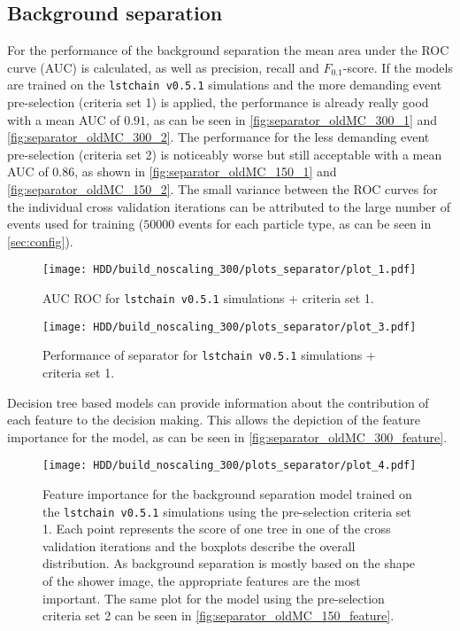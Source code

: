 \subsection{Background separation}
For the performance of the background separation the mean area under the ROC curve (AUC) is calculated, as well as precision, recall and $F_{0.1}$-score.
If the models are trained on the \texttt{lstchain v0.5.1} simulations and the more demanding event pre-selection (criteria set 1) is applied,
the performance is already really good with a mean AUC of $\num{0.91}$, as can be seen in \autoref{fig:separator_oldMC_300_1} and \autoref{fig:separator_oldMC_300_2}.
The performance for the less demanding event pre-selection (criteria set 2) is noticeably worse but still acceptable with a mean AUC of $\num{0.86}$, as shown in
\autoref{fig:separator_oldMC_150_1} and \autoref{fig:separator_oldMC_150_2}. The small variance between the ROC curves for the individual cross validation iterations 
can be attributed to the large number of events used for training ($\num{50000}$ events for each particle type, as can be seen in \autoref{sec:config}). 
\begin{figure}
    \centering
    \texttt{[image: HDD/build\_noscaling\_300/plots\_separator/plot\_1.pdf]}
    \caption{AUC ROC for \texttt{lstchain v0.5.1} simulations + criteria set 1.}
    \label{fig:separator_oldMC_300_1}
\end{figure}
\begin{figure}
    \centering
    \texttt{[image: HDD/build\_noscaling\_300/plots\_separator/plot\_3.pdf]}
    \caption{Performance of separator for \texttt{lstchain v0.5.1} simulations + criteria set 1.}
    \label{fig:separator_oldMC_300_2}
\end{figure}

Decision tree based models can provide information about the contribution of each feature to the decision making.
This allows the depiction of the feature importance for the model, as can be seen in \autoref{fig:separator_oldMC_300_feature}.
\begin{figure}
    \centering
    \texttt{[image: HDD/build\_noscaling\_300/plots\_separator/plot\_4.pdf]}
    \caption{Feature importance for the background separation model trained on the \texttt{lstchain v0.5.1} simulations using the pre-selection criteria set 1.
        Each point represents the score of one tree in one of the cross validation iterations and the boxplots describe the overall distribution.
        As background separation is mostly based on the shape of the shower image, the appropriate features are the most important.
        The same plot for the model using the pre-selection criteria set 2 can be seen in \autoref{fig:separator_oldMC_150_feature}.
    }
    \label{fig:separator_oldMC_300_feature}
\end{figure}

